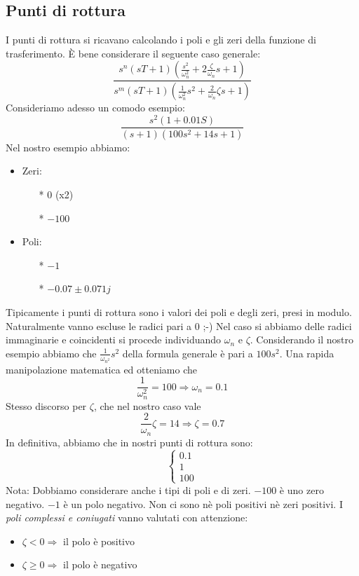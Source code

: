 \documentclass[a4paper]{report}
\begin{document}
\subsection{Punti di rottura}
I punti di rottura si ricavano calcolando i poli e gli zeri della
funzione di trasferimento. \`E bene considerare il seguente caso
generale:
{\Large\begin{equation}
  \frac{s^n (sT + 1)\left(\frac{s^2}{\omega_n^2} +
    2\frac{\zeta}{\omega_n}s + 1\right)}{s^m (sT + 1) \left(
    \frac{1}{\omega_n^2}s^2 + \frac{2}{\omega_n}\zeta s + 1\right)}
\end{equation}}
Consideriamo adesso un comodo esempio:
\[
  \frac{s^2 (1 + 0.01S)}{(s + 1)(100 s^2 + 14s + 1)}
\]
Nel nostro esempio abbiamo:
\begin{itemize}
  \item Zeri:
    \begin{itemize}
    \item[*] $0$ (x2)
    \item[*] $-100$
    \end{itemize}
  \item Poli:
    \begin{itemize}
      \item[*] $-1$
      \item[*] $-0.07 \pm 0.071j$
    \end{itemize}
\end{itemize}
Tipicamente i punti di rottura sono i valori dei poli e degli zeri,
presi in modulo. Naturalmente vanno escluse le radici pari a $0$ ;-)
Nel caso si abbiamo delle radici immaginarie e coincidenti si procede
individuando $\omega_n$ e $\zeta$. Considerando il nostro esempio
abbiamo che $\frac{1}{\omega_{n^2}} s^2$ della formula generale \`e pari
a $100 s^2$. Una rapida manipolazione matematica ed otteniamo
che $$\frac{1}{\omega_n^2} = 100 \Rightarrow \omega_n = 0.1$$
Stesso discorso per $\zeta$, che nel nostro caso
vale $$\frac{2}{\omega_n}\zeta = 14 \Rightarrow \zeta = 0.7$$
In definitiva, abbiamo che in nostri punti di rottura sono:
\[
\left\{
\begin{array}{l}
  0.1\\
  1\\
  100
\end{array}
\right .
\]
Nota: Dobbiamo considerare anche i tipi di poli e di zeri. $-100$ \`e
uno zero negativo. $-1$ \`e un polo negativo. Non ci sono n\`e poli
positivi n\`e zeri positivi. I {\em poli complessi e coniugati} vanno
valutati con attenzione:
\begin{itemize}
\item $\zeta < 0 \Rightarrow$ il polo \`e positivo
\item $\zeta \geq 0 \Rightarrow$ il polo \`e negativo
\end{itemize}
\end{document}
